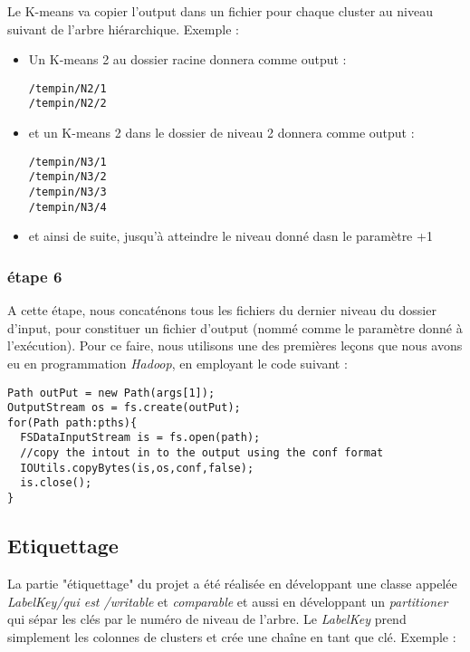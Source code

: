 \documentclass[12pt]{article}
\begin{document}
Le K-means va copier l'output dans un fichier pour chaque cluster au niveau suivant de l'arbre hiérarchique. Exemple :

\begin{itemize}
\item Un K-means 2 au dossier racine donnera comme output :

\begin{verbatim}
/tempin/N2/1
/tempin/N2/2
\end{verbatim}

\item et un K-means 2 dans le dossier de niveau 2 donnera comme output :

\begin{verbatim}
/tempin/N3/1
/tempin/N3/2
/tempin/N3/3
/tempin/N3/4
\end{verbatim}

\item et ainsi de suite, jusqu'à atteindre le niveau donné dasn le paramètre +1
\end{itemize}

\subsubsection{étape 6}
\label{sec:org23c7f99}

A cette étape, nous concaténons tous les fichiers du dernier niveau du dossier d'input, pour constituer un fichier 
d'output (nommé comme le paramètre donné à l'exécution). Pour ce faire, nous utilisons une des premières leçons que nous
avons eu en programmation \emph{Hadoop}, en employant le code suivant : 

\begin{verbatim}
Path outPut = new Path(args[1]);
OutputStream os = fs.create(outPut);
for(Path path:pths){
  FSDataInputStream is = fs.open(path);
  //copy the intout in to the output using the conf format
  IOUtils.copyBytes(is,os,conf,false);
  is.close();
}
\end{verbatim}

\subsection{Etiquettage}
\label{sec:org96d6485}

La partie "étiquettage" du projet a été réalisée en développant une classe appelée \emph{LabelKey/qui est /writable} 
et \emph{comparable} et aussi en développant un \emph{partitioner} qui sépar les clés par le numéro de niveau de l'arbre.
Le \emph{LabelKey} prend simplement les colonnes de clusters et crée une chaîne en tant que clé. Exemple : 
\end{document}
